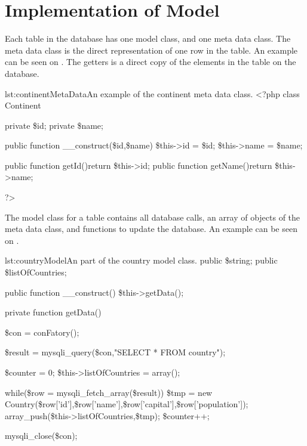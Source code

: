 \section{Implementation of Model}
Each table in the database has one model class, and one meta data class. The meta data class is the direct representation of one row in the table. An example can be seen on . The getters is a direct copy of the elements in the table on the database.

\begin{code}{lst:continentMetaData}{An example of the continent meta data class.}
<?php
class Continent{
	private \$id;
	private \$name;
	
	public function __construct(\$id,\$name){
		\$this->id = \$id;
		\$this->name = \$name;
	}
	
	public function getId(){return \$this->id;}
	public function getName(){return \$this->name;}
}
?>
\end{code}

The model class for a table contains all database calls, an array of objects of the meta data class, and functions to update the database. An example can be seen on .

\begin{code}{lst:countryModel}{An part of the country model class.}
public \$string;
	public \$listOfCountries;
 
    public function __construct(){
        \$this->getData();
    }
	
	private function getData(){
		\$con = conFatory();

		\$result = mysqli_query(\$con,"SELECT * FROM country");
		
		\$counter = 0;
		\$this->listOfCountries = array();
		
		while(\$row = mysqli_fetch_array(\$result)) {
			\$tmp = new Country(\$row['id'],\$row['name'],\$row['capital'],\$row['population']);
			array_push(\$this->listOfCountries,\$tmp);
			\$counter++;
		}

		mysqli_close(\$con);
	}
	\end{code}